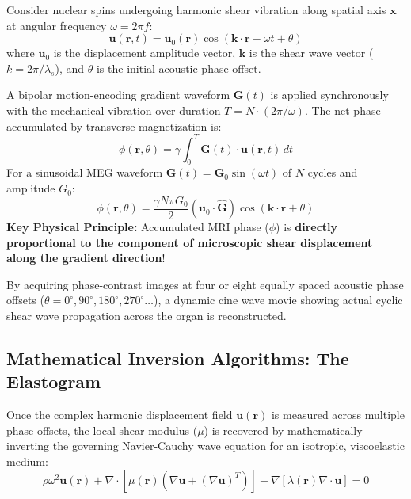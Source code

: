 \documentclass[11pt,a4paper]{article}
\begin{document}
\begin{physicsbox}
Consider nuclear spins undergoing harmonic shear vibration along spatial axis $\mathbf{x}$ at angular frequency $\omega = 2\pi f$:
\begin{equation}
    \mathbf{u}(\mathbf{r}, t) = \mathbf{u}_0(\mathbf{r}) \cos(\mathbf{k} \cdot \mathbf{r} - \omega t + \theta)
\end{equation}
where $\mathbf{u}_0$ is the displacement amplitude vector, $\mathbf{k}$ is the shear wave vector ($k = 2\pi / \lambda_s$), and $\theta$ is the initial acoustic phase offset.

A bipolar motion-encoding gradient waveform $\mathbf{G}(t)$ is applied synchronously with the mechanical vibration over duration $T = N \cdot (2\pi / \omega)$. The net phase accumulated by transverse magnetization is:
\begin{equation}
    \phi(\mathbf{r}, \theta) = \gamma \int_0^T \mathbf{G}(t) \cdot \mathbf{u}(\mathbf{r}, t) \, dt
\end{equation}
For a sinusoidal MEG waveform $\mathbf{G}(t) = \mathbf{G}_0 \sin(\omega t)$ of $N$ cycles and amplitude $G_0$:
\begin{equation}
    \phi(\mathbf{r}, \theta) = \frac{\gamma N \pi G_0}{2} (\mathbf{u}_0 \cdot \hat{\mathbf{G}}) \cos(\mathbf{k} \cdot \mathbf{r} + \theta)
\end{equation}
\textbf{Key Physical Principle:} Accumulated MRI phase ($\phi$) is \textbf{directly proportional to the component of microscopic shear displacement along the gradient direction}! 

By acquiring phase-contrast images at four or eight equally spaced acoustic phase offsets ($\theta = 0^\circ, 90^\circ, 180^\circ, 270^\circ\dots$), a dynamic cine wave movie showing actual cyclic shear wave propagation across the organ is reconstructed.
\end{physicsbox}

\subsection{Mathematical Inversion Algorithms: The Elastogram}
Once the complex harmonic displacement field $\mathbf{u}(\mathbf{r})$ is measured across multiple phase offsets, the local shear modulus ($\mu$) is recovered by mathematically inverting the governing Navier-Cauchy wave equation for an isotropic, viscoelastic medium:
\begin{equation}
    \rho \omega^2 \mathbf{u}(\mathbf{r}) + \nabla \cdot [ \mu(\mathbf{r}) (\nabla \mathbf{u} + (\nabla \mathbf{u})^T) ] + \nabla [ \lambda(\mathbf{r}) \nabla \cdot \mathbf{u} ] = 0
\end{equation}
\end{document}
